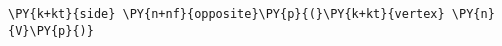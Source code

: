 \begin{Verbatim}[commandchars=\\\{\}]
    \PY{k+kt}{side} \PY{n+nf}{opposite}\PY{p}{(}\PY{k+kt}{vertex} \PY{n}{V}\PY{p}{)}
\end{Verbatim}
